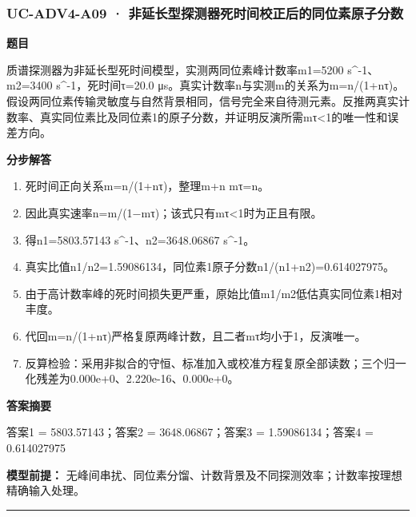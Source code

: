 \documentclass[UTF8,11pt,a4paper]{ctexart}
\begin{document}
\subsubsection*{UC-ADV4-A09 · 非延长型探测器死时间校正后的同位素原子分数}
\noindent\textbf{题目}\par
质谱探测器为非延长型死时间模型，实测两同位素峰计数率m1=5200 s\textasciicircum{}-1、m2=3400 s\textasciicircum{}-1，死时间τ=20.0 μs。真实计数率n与实测m的关系为m=n/(1+nτ)。假设两同位素传输灵敏度与自然背景相同，信号完全来自待测元素。反推两真实计数率、真实同位素比及同位素1的原子分数，并证明反演所需mτ<1的唯一性和误差方向。\par
\medskip\noindent\textbf{分步解答}
\begin{enumerate}
\item 死时间正向关系m=n/(1+nτ)，整理m+n mτ=n。
\item 因此真实速率n=m/(1−mτ)；该式只有mτ<1时为正且有限。
\item 得n1=5803.57143 s\textasciicircum{}-1、n2=3648.06867 s\textasciicircum{}-1。
\item 真实比值n1/n2=1.59086134，同位素1原子分数n1/(n1+n2)=0.614027975。
\item 由于高计数率峰的死时间损失更严重，原始比值m1/m2低估真实同位素1相对丰度。
\item 代回m=n/(1+nτ)严格复原两峰计数，且二者mτ均小于1，反演唯一。
\item 反算检验：采用非拟合的守恒、标准加入或校准方程复原全部读数；三个归一化残差为0.000e+0、2.220e-16、0.000e+0。
\end{enumerate}
\noindent\textbf{答案摘要}\par
答案1 = 5803.57143；答案2 = 3648.06867；答案3 = 1.59086134；答案4 = 0.614027975\par
\noindent\textbf{模型前提：}
无峰间串扰、同位素分馏、计数背景及不同探测效率；计数率按理想精确输入处理。\par
\medskip\hrule\medskip
{}
\end{document}
